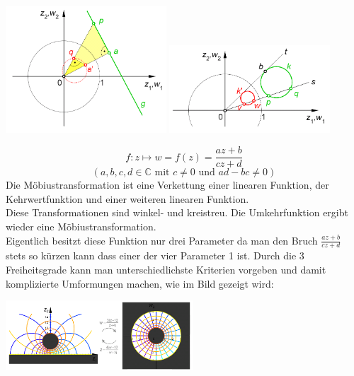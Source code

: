   		\hspace*{2cm}
  		\begin{minipage}{6cm}
    		\includegraphics[width=6cm]{./bilder/GeradeKreisspiegelung.png} 
      		\includegraphics[width=6cm]{./bilder/KreisKreisspiegelung.png}
    	\end{minipage}

  		\begin{minipage}{10cm}
    		$$ f : z \mapsto w = f(z) = \frac{az + b}{cz + d}$$
    		$$(a, b, c, d \in 
    		\mathbb{C} \text{ mit } c \neq 0 \text{ und } ad - bc \neq 0) $$
    		Die Möbiustransformation ist eine Verkettung einer linearen Funktion, der Kehrwertfunktion und einer weiteren linearen Funktion. \\
    		Diese Transformationen sind winkel- und kreistreu. Die Umkehrfunktion ergibt wieder eine Möbiustransformation. \\
    		Eigentlich besitzt diese Funktion nur drei Parameter da man den Bruch $\frac{az + b}{cz + d}$ stets so kürzen kann dass einer der vier Parameter 1 ist. Durch die 3 Freiheitsgrade kann man unterschiedlichste Kriterien vorgeben und damit komplizierte Umformungen machen, wie im Bild gezeigt wird:  
  		\end{minipage}
  		\hspace*{2cm}
  		\begin{minipage}{7cm}
    		\includegraphics[width=7cm]{./bilder/Moebiustransformation.png} 
  		\end{minipage}

